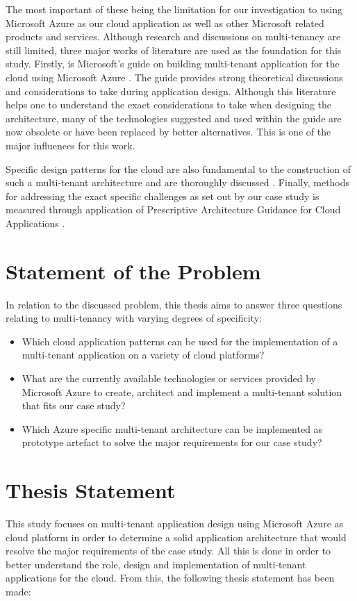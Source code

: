The most important of these being the limitation for our investigation to using Microsoft Azure as our cloud application as well as other Microsoft related products and services. Although research and discussions on multi-tenancy are still limited, three major works of literature are used as the foundation for this study. Firstly, is Microsoft's guide on building multi-tenant application for the cloud using Microsoft Azure \cite{Betts2012-ad}. The guide provides strong theoretical discussions and considerations to take during application design. Although this literature helps one to understand the exact considerations to take when designing the architecture, many of the technologies suggested and used within the guide are now obsolete or have been replaced by better alternatives. This is one of the major influences for this work.

Specific design patterns for the cloud are also fundamental to the construction of such a multi-tenant architecture and are thoroughly discussed \cite{Wilder2012-so}. Finally, methods for addressing the exact specific challenges as set out by our case study is measured through application of Prescriptive Architecture Guidance for Cloud Applications \cite{Homer2014}. 

\section{Statement of the Problem}
In relation to the discussed problem, this thesis aims to answer three questions relating to multi-tenancy with varying degrees of specificity:
\begin{itemize}
\item Which cloud application patterns can be used for the implementation of a multi-tenant application on a variety of cloud platforms?
\item What are the currently available technologies or services provided by Microsoft Azure to create, architect and implement a multi-tenant solution that fits our case study?
\item Which Azure specific multi-tenant architecture can be implemented as prototype  artefact to solve the major requirements for our case study?
\end{itemize}

\section{Thesis Statement}
This study focuses on multi-tenant application design using Microsoft Azure as cloud platform in order to determine a solid application architecture that would resolve the major requirements of the case study. All this is done in order to better understand the role, design and implementation of multi-tenant applications for the cloud. From this, the following thesis statement has been made:
 

